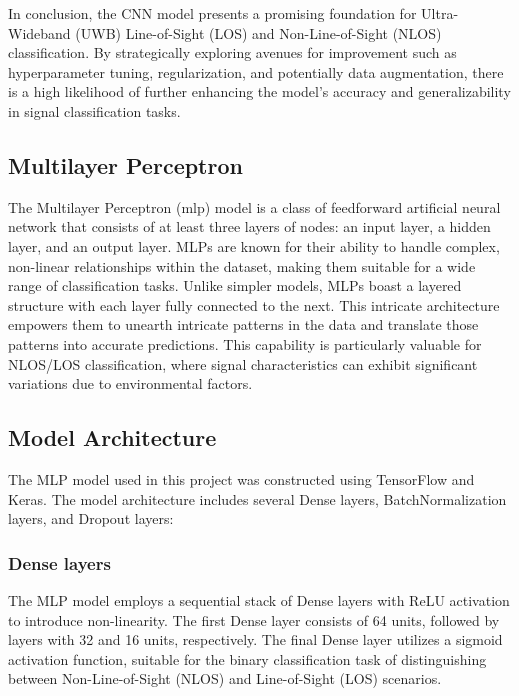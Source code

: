 In conclusion, the CNN model presents a promising foundation for Ultra-Wideband (UWB) Line-of-Sight (LOS) and Non-Line-of-Sight (NLOS) classification. By strategically exploring avenues for improvement such as hyperparameter tuning, regularization, and potentially data augmentation, there is a high likelihood of further enhancing the model's accuracy and generalizability in signal classification tasks.





\subsection{\Gls{Multilayer Perceptron}}\label{mlp}                                                                                 
The Multilayer Perceptron (\acrshort{mlp}) model is a class of feedforward artificial neural network that consists of at least three layers of nodes: an input layer, a hidden layer, and an output layer. MLPs are known for their ability to handle complex, non-linear relationships within the dataset, making them suitable for a wide range of classification tasks. Unlike simpler models, MLPs boast a layered structure with each layer fully connected to the next. This intricate architecture empowers them to unearth intricate patterns in the data and translate those patterns into accurate predictions. This capability is particularly valuable for NLOS/LOS classification, where signal characteristics can exhibit significant variations due to environmental factors.

\subsection{Model Architecture}

The MLP model used in this project was constructed using TensorFlow and Keras. The model architecture includes several Dense layers, BatchNormalization layers, and Dropout layers:

\subsubsection{Dense layers}

The MLP model employs a sequential stack of Dense layers with ReLU activation to introduce non-linearity. The first Dense layer consists of 64 units, followed by layers with 32 and 16 units, respectively. The final Dense layer utilizes a sigmoid activation function, suitable for the binary classification task of distinguishing between Non-Line-of-Sight (NLOS) and Line-of-Sight (LOS) scenarios.

